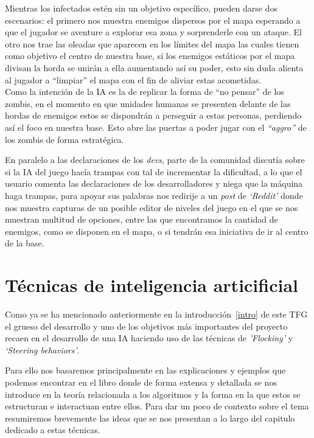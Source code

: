 Mientras los infectados estén sin un objetivo específico, pueden darse dos escenarios:
el primero nos muestra enemigos dispersos por el mapa esperando a que el jugador se aventure
a explorar esa zona y sorprenderle con un ataque. El otro nos trae las oleadas que aparecen
en los límites del mapa las cuales tienen como objetivo el centro de nuestra base, si los
enemigos estáticos por el mapa divisan la horda se unirán a ella aumentando así su poder, esto
sin duda alienta al jugador a ``limpiar'' el mapa con el fin de aliviar estas acometidas.\\
Como la intención de la \ac{IA} es la de replicar la forma de ``no pensar'' de los zombis, en
el momento en que unidades humanas se presenten delante de las hordas de enemigos estos se
dispondrán a perseguir a estas personas, perdiendo así el foco en nuestra base. Esto abre las
puertas a poder jugar con el \textit{``aggro''} de los zombis de forma estratégica.

En paralelo a las declaraciones de los \textit{devs}, parte de la comunidad discutía sobre si
la \ac{IA} del juego hacía trampas con tal de incrementar la dificultad, a lo que el usuario
\citeauthor*{Steam_User2019} comenta las declaraciones de los desarrolladores y niega que la
máquina haga trampas, para apoyar sus palabras nos redirije a un \textit{post} de \textit{`Reddit'}
donde \citeauthor*{Pikachunet2018} nos muestra capturas de un posible editor de niveles del
juego en el que se nos muestran multitud de opciones, entre las que encontramos la cantidad de
enemigos, como se disponen en el mapa, o si tendrán esa iniciativa de ir al centro de la base.


\section{Técnicas de inteligencia articificial}
Como ya se ha mencionado anteriormente en la introducción~\ref{intro} de este \ac{TFG}
el grueso del desarrollo y uno de los objetivos más importantes del proyecto recaen en
el desarrollo de una \ac{IA} haciendo uso de las técnicas de \textit{'Flocking'} y
\textit{`Steering behaviors'}.

Para ello nos basaremos principalmente en las explicaciones y ejemplos que podemos
encontrar en el libro \cite[ch.~3]{Millington2009} donde de forma extensa y detallada
se nos introduce en la teoría relacionada a los algoritmos y la forma en la que estos
se estructuran e interactuan entre ellos. Para dar un poco de contexto sobre el tema
resumiremos brevemente las ideas que se nos presentan a lo largo del capitulo dedicado
a estas técnicas. 

